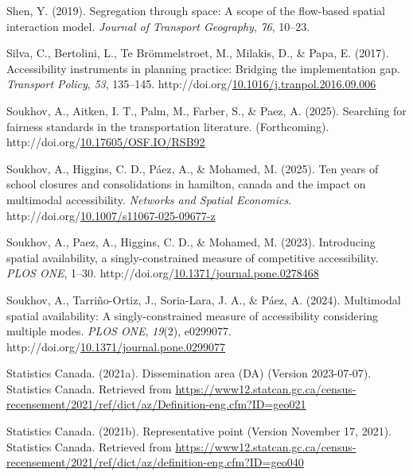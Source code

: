 \documentclass[
11pt, %
oneside, %
english, %
singlespacing, %
]{macthesis} %
\newlength{\cslhangindent}
\newenvironment{CSLReferences}[2] %
{\begin{list}{}{%
	\setlength{\itemindent}{0pt}
	\setlength{\leftmargin}{0pt}
	\setlength{\parsep}{0pt}
	\ifodd #1
	\setlength{\leftmargin}{\cslhangindent}
	\setlength{\itemindent}{-1\cslhangindent}
	\fi
	\setlength{\itemsep}{#2\baselineskip}}}
{\end{list}}
\begin{document}
\begin{CSLReferences}{1}{0}
Shen, Y. (2019). Segregation through space: A scope of the flow-based spatial interaction model. \emph{Journal of Transport Geography}, \emph{76}, 10--23.

Silva, C., Bertolini, L., Te Brömmelstroet, M., Milakis, D., \& Papa, E. (2017). Accessibility instruments in planning practice: Bridging the implementation gap. \emph{Transport Policy}, \emph{53}, 135--145. http://doi.org/\href{https://doi.org/10.1016/j.tranpol.2016.09.006}{10.1016/j.tranpol.2016.09.006}

Soukhov, A., Aitken, I. T., Palm, M., Farber, S., \& Paez, A. (2025). Searching for fairness standards in the transportation literature. (Forthcoming). http://doi.org/\href{https://doi.org/10.17605/OSF.IO/RSB92}{10.17605/OSF.IO/RSB92}

Soukhov, A., Higgins, C. D., Páez, A., \& Mohamed, M. (2025). Ten years of school closures and consolidations in hamilton, canada and the impact on multimodal accessibility. \emph{Networks and Spatial Economics}. http://doi.org/\href{https://doi.org/10.1007/s11067-025-09677-z}{10.1007/s11067-025-09677-z}

Soukhov, A., Paez, A., Higgins, C. D., \& Mohamed, M. (2023). Introducing spatial availability, a singly-constrained measure of competitive accessibility. \emph{{PLOS} {ONE}}, 1--30. http://doi.org/\href{https://doi.org/10.1371/journal.pone.0278468}{10.1371/journal.pone.0278468}

Soukhov, A., Tarriño-Ortiz, J., Soria-Lara, J. A., \& Páez, A. (2024). Multimodal spatial availability: A singly-constrained measure of accessibility considering multiple modes. \emph{{PLOS} {ONE}}, \emph{19}(2), e0299077. http://doi.org/\href{https://doi.org/10.1371/journal.pone.0299077}{10.1371/journal.pone.0299077}

Statistics Canada. (2021a). Dissemination area (DA) (Version 2023-07-07). Statistics Canada. Retrieved from \url{https://www12.statcan.gc.ca/census-recensement/2021/ref/dict/az/Definition-eng.cfm?ID=geo021}

Statistics Canada. (2021b). Representative point (Version November 17, 2021). Statistics Canada. Retrieved from \url{https://www12.statcan.gc.ca/census-recensement/2021/ref/dict/az/definition-eng.cfm?ID=geo040}


\end{CSLReferences}
\end{document}
